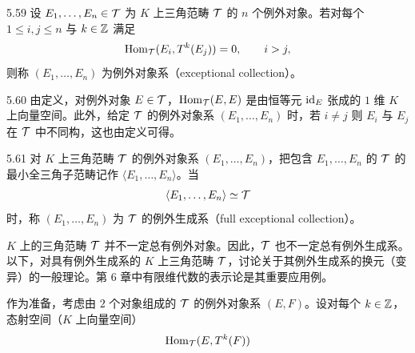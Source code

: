 \begin{definition}{5.59} 设 $E_{1},\ldots,E_{n} \in \mathcal{T}$ 为 $K$ 上三角范畴 $\mathcal{T}$ 的 $n$ 个例外对象。若对每个 $1 \le i,j \le n$ 与 $k \in \mathbb{Z}$ 满足
\[
  \operatorname{Hom}_{\mathcal{T}}(E_{i},T^{k}(E_{j})) = 0, \qquad i > j,
\]
则称 $(E_{1},\ldots,E_{n})$ 为例外对象系（exceptional collection）。\end{definition}

\begin{remark}{5.60} 由定义，对例外对象 $E \in \mathcal{T}$，$\operatorname{Hom}_{\mathcal{T}}(E,E)$ 是由恒等元 $\mathrm{id}_{E}$ 张成的 $1$ 维 $K$ 上向量空间。此外，给定 $\mathcal{T}$ 的例外对象系 $(E_{1},\ldots,E_{n})$ 时，若 $i \ne j$ 则 $E_{i}$ 与 $E_{j}$ 在 $\mathcal{T}$ 中不同构，这也由定义可得。\end{remark}

\begin{definition}{5.61} 对 $K$ 上三角范畴 $\mathcal{T}$ 的例外对象系 $(E_{1},\ldots,E_{n})$，把包含 $E_{1},\ldots,E_{n}$ 的 $\mathcal{T}$ 的最小全三角子范畴记作 $\langle E_{1},\ldots,E_{n}\rangle$。当
\[
  \langle E_{1},\ldots,E_{n}\rangle \simeq \mathcal{T}
\]
时，称 $(E_{1},\ldots,E_{n})$ 为 $\mathcal{T}$ 的例外生成系（full exceptional collection）。\end{definition}


$K$ 上的三角范畴 $\mathcal{T}$ 并不一定总有例外对象。因此，$\mathcal{T}$ 也不一定总有例外生成系。以下，对具有例外生成系的 $K$ 上三角范畴 $\mathcal{T}$，讨论关于其例外生成系的换元（变异）的一般理论。第 6 章中有限维代数的表示论是其重要应用例。

作为准备，考虑由 $2$ 个对象组成的 $\mathcal{T}$ 的例外对象系 $(E,F)$。设对每个 $k \in \mathbb{Z}$，态射空间（$K$ 上向量空间）
\[
  \operatorname{Hom}_{\mathcal{T}}(E,T^{k}(F))
\]

